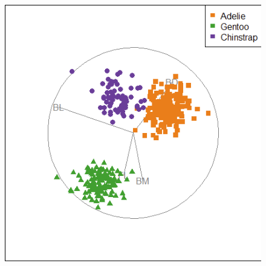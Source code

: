 \documentclass[
  letterpaper,
  10pt,
  krantz2]{krantz}
\begin{document}
{\begin{figure}
\begin{minipage}{0.50\linewidth}
{\includegraphics[width=1\textwidth,height=\textheight]{images/tours/peng-tour-lda-final.png}

}


\end{minipage}%
%
\begin{minipage}{0.50\linewidth}

\end{minipage}
\end{figure}}
\end{document}

